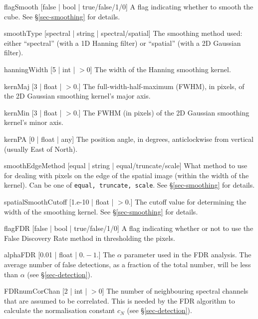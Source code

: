 \begin{Lentry}
\item[{flagSmooth [false | bool | true/false/1/0]}] A flag indicating whether to
  smooth the cube. See \S\ref{sec-smoothing} for details. 
\item[{smoothType [spectral | string | spectral/spatial]}] The
  smoothing method used: either ``spectral'' (with a 1D Hanning
  filter) or ``spatial'' (with a 2D Gaussian filter).
\item[{hanningWidth [5 | int | $> 0$]}] The width of the Hanning
  smoothing kernel.
\item[{kernMaj [3 | float | $> 0.$]}] The full-width-half-maximum
  (FWHM), in pixels, of the 2D Gaussian smoothing kernel's major axis.
\item[{kernMin [3 | float | $> 0.$]}] The FWHM (in pixels) of the 2D Gaussian smoothing kernel's
  minor axis.
\item[{kernPA [0 | float | any]}] The position angle, in degrees,
  anticlockwise from vertical (\ie usually East of North).
\item[{smoothEdgeMethod [equal | string | equal/truncate/scale]}] What
  method to use for dealing with pixels on the edge of the spatial
  image (\ie within the width of the kernel). Can be one of
  \texttt{equal, truncate, scale}. See \S\ref{sec-smoothing} for
  details.
\item[{spatialSmoothCutoff [1.e-10 | float | $> 0.$]}] The cutoff
  value for determining the width of the smoothing kernel. See
  \S\ref{sec-smoothing} for details.
\end{Lentry}

\begin{Lentry}
\item[{flagFDR [false | bool | true/false/1/0]}] A flag indicating whether or not to use
  the False Discovery Rate method in thresholding the pixels.
\item[{alphaFDR [0.01 | float | $0. - 1.$]}] The $\alpha$ parameter used in the FDR
  analysis. The average number of false detections, as a fraction of
  the total number, will be less than $\alpha$ (see
  \S\ref{sec-detection}).
\item[{FDRnumCorChan [2 | int | $> 0$]}] The number of neighbouring spectral
  channels that are assumed to be correlated. This is needed by the
  FDR algorithm to calculate the normalisation constant $c_N$ (see
  \S\ref{sec-detection}). 
\end{Lentry}

